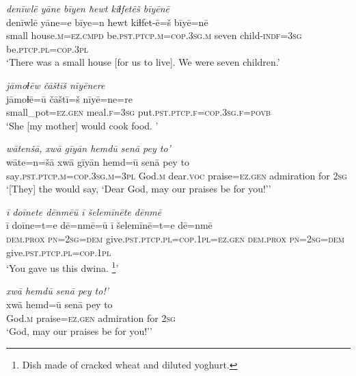 \ea \label{ŽE.44}
\textit{denīwlē yāne bīyen ħewt kiɫfetēš bīyēnē} \\ 
\gll denīwlē yāne=e bīye=n ħewt kiɫfet-ē=š bīyē=nē \\ 
 small house\textsc{.m}\textsc{=ez}\textsc{.cmpd} be\textsc{.pst}\textsc{.ptcp}\textsc{.m}\textsc{=cop}\textsc{.3sg}\textsc{.m} seven child\textsc{-indf}\textsc{=3sg} be\textsc{.ptcp}\textsc{.pl}\textsc{=cop}\textsc{.3pl} \\ 
\glt `There was a small house [for us to live]. We were seven children.'
\z 
 
\ea \label{ŽE.45}
\textit{jāmoɫēw čāštīš nīyēnere} \\ 
\gll jāmoɫē=ū čāštī=š nīyē=ne=re \\ 
 small\_pot\textsc{\textsc{=ez.gen}} meal\textsc{.f}\textsc{=3sg} put\textsc{.pst}\textsc{.ptcp}\textsc{.f}\textsc{=cop}\textsc{.3sg}\textsc{.f}\textsc{=\textsc{povb}} \\ 
\glt `She [my mother] would cook food. '
\z 
 
\ea \label{ŽE.49}
\textit{wātenšā, xwā gīyān hemdū senā pey to’} \\ 
\gll wāte=n=šā xwā gīyān hemd=ū senā pey to \\ 
 say\textsc{.pst}\textsc{.ptcp}\textsc{.m}\textsc{=cop}\textsc{.3sg}\textsc{.m}\textsc{=3pl} God\textsc{.m} dear.\textsc{voc} praise\textsc{\textsc{=ez.gen}} admiration for \textsc{2sg} \\ 
\glt `[They] the would say, ‘Dear God, may our praises be for you!’'
\z 
 
\ea \label{ŽE.50}
\textit{ī doīnete dēnmēū ī šelemīnēte dēnmē} \\ 
\gll ī doīne=t=e dē=nmē=ū ī šelemīnē=t=e dē=nmē \\ 
 \textsc{dem.prox} \textsc{pn}\textsc{=\textsc{2sg}}\textsc{=dem} give\textsc{.pst}\textsc{.ptcp}\textsc{.pl}\textsc{=cop}\textsc{.1pl}\textsc{\textsc{=ez.gen}} \textsc{dem.prox} \textsc{pn}\textsc{=\textsc{2sg}}\textsc{=dem} give\textsc{.pst}\textsc{.ptcp}\textsc{.pl}\textsc{=cop}\textsc{.1pl} \\ 
\glt `You gave us this dwina. \footnote{Dish made of cracked wheat and diluted yoghurt.}'
\z 
 
\ea \label{ŽE.54}
\textit{xwā hemdū senā pey to!’} \\ 
\gll xwā hemd=ū senā pey to \\ 
 God\textsc{.m} praise\textsc{\textsc{=ez.gen}} admiration for \textsc{2sg} \\ 
\glt `God, may our praises be for you!’'
\z 
 
